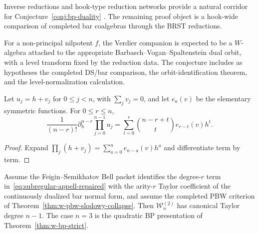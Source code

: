 \begin{remark}
\label{rem:hook-type-evidence}
Inverse reductions and hook-type reduction networks provide a
natural corridor for Conjecture~\ref{conj:bp-duality}
\cite{FehilyHook,CLNS24,CFLN24,GenraStages}.  The remaining proof
object is a hook-wide comparison of completed bar coalgebras through
the BRST reductions.
\end{remark}

\begin{conjecture}
\label{conj:w-orbit-duality}
For a non-principal nilpotent $f$, the Verdier companion is expected
to be a $W$-algebra attached to the appropriate
Barbasch--Vogan--Spaltenstein dual orbit, with a level transform fixed
by the reduction data.  The conjecture includes as hypotheses the
completed DS/bar comparison, the orbit-identification theorem, and
the level-normalization calculation.
\end{conjecture}

\begin{theorem}
\label{thm:w-subregular-appell}
Let $u_j=h+v_j$ for $0\le j<n$, with $\sum_jv_j=0$, and let
$e_a(v)$ be the elementary symmetric functions.  For $0\le r\le n$,
\begin{equation}\label{eq:subregular-appell-repaired}
\frac{1}{(n-r)!}\partial_h^{n-r}\prod_{j=0}^{n-1}u_j
=\sum_{t=0}^r\binom{n-r+t}{t}e_{r-t}(v)h^t.
\end{equation}
\end{theorem}

\begin{proof}
Expand $\prod_j(h+v_j)=\sum_{a=0}^ne_{n-a}(v)h^a$ and differentiate
term by term.
\end{proof}

\begin{theorem}
\label{thm:w-subregular-classification}
Assume the Feigin--Semikhatov Bell packet identifies the degree-$r$
term in~\eqref{eq:subregular-appell-repaired} with the arity-$r$
Taylor coefficient of the continuously dualized bar normal form, and
assume the completed PBW criterion of
Theorem~\ref{thm:w-pbw-slodowy-collapse}.  Then
$\mathcal W_n^{(2)}$ has canonical Taylor degree $n-1$.  The case
$n=3$ is the quadratic BP presentation of
Theorem~\ref{thm:w-bp-strict}.
\end{theorem}

